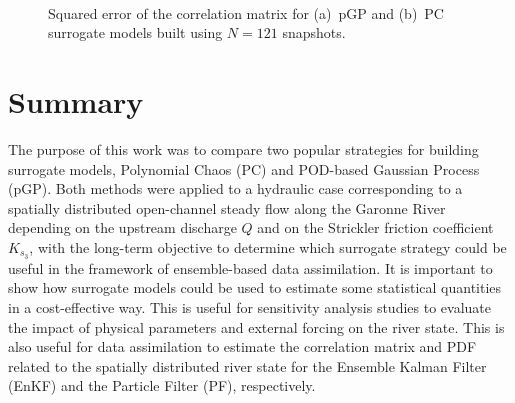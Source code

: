 \begin{figure}[!ht]               
\centering
{}
 ~ 
\caption{Squared error of the correlation matrix for (a)~pGP and (b)~PC surrogate models built using $N = 121$ snapshots.}
\label{fig:corr-mse}
\end{figure}

\section{Summary}\label{sec:ccl}

The purpose of this work was to compare two popular strategies for building surrogate models, Polynomial Chaos (PC) and POD-based Gaussian Process (pGP). Both methods were applied to a hydraulic case corresponding to a spatially distributed open-channel steady flow along the Garonne River depending on the upstream discharge $Q$ and on the Strickler friction coefficient $K_{s_3}$, with the long-term objective to determine which surrogate strategy could be useful in the framework of ensemble-based data assimilation. It is important to show how surrogate models could be used to estimate some statistical quantities in a cost-effective way. This is useful for sensitivity analysis studies to evaluate the impact of physical parameters and external forcing on the river state. This is also useful for data assimilation to estimate the correlation matrix and PDF related to the spatially distributed river state for the Ensemble Kalman Filter (EnKF) and the Particle Filter (PF), respectively.

